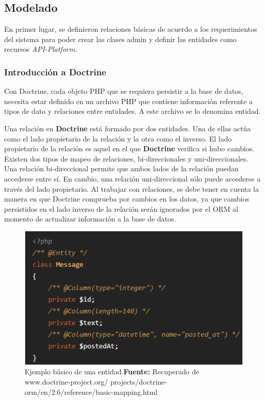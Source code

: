 
\subsection{Modelado}%
\label{sub:modelado}
En primer lugar, se definieron relaciones básicas de acuerdo a los requerimientos del sistema para poder crear las clases admin y definir las entidades como
recursos \textit{API-Platform}.

\subsubsection{Introducción a Doctrine}%
\label{ssub:introducción_doctrine}
Con Doctrine, cada objeto PHP que se requiera persistir a la base de datos, necesita estar definido en un archivo PHP que
contiene información referente a tipos de dato y relaciones entre entidades. A este archivo se lo denomina entidad.

Una relación en \textbf{Doctrine} está formado por dos entidades. Una de ellas actúa como el lado propietario de la relación y la otra como el inverso\@.
El lado propietario de la relación es aquel en el que \textbf{Doctrine} verifica si hubo cambios.
Existen dos tipos de mapeo de relaciones, bi-direccionales y uni-direccionales\@.
Una relación bi-direccional permite que ambos lados de la relación puedan accederse entre sí\@. En cambio, una relación uni-direccional sólo puede accederse
a través del lado propietario\@.
Al trabajar con relaciones, se debe tener en cuenta la manera en que Doctrine comprueba por cambios en los datos, ya que cambios persistidos en el lado
inverso de la relación serán ignorados por el ORM al momento de actualizar información a la base de datos.

\begin{figure}[H]
    \includegraphics[width=1\linewidth]{image/entidad-doctrine.png}
    \caption[Ejemplo básico de una entidad]{Ejemplo básico de una entidad.\newline \textbf{Fuente:} Recuperado de www.doctrine-project.org/
    projects/doctrine-orm/en/2.6/reference/basic-mapping.html}%
    \label{fig:image/entidad-doctrine}
\end{figure}



